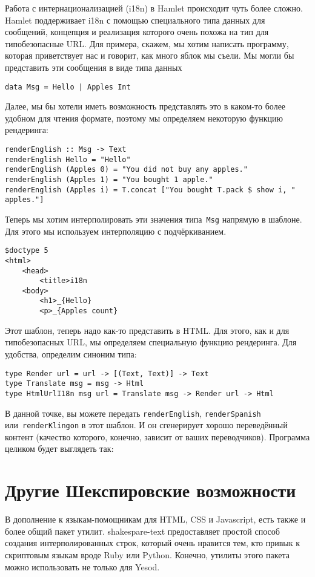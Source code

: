 Работа с интернационализацией (i18n) в Hamlet происходит чуть более
сложно.  Hamlet поддерживает i18n с помощью специального типа данных
для сообщений, концепция и реализация которого очень похожа на тип для типобезопасные
URL. Для примера, скажем, мы хотим написать программу, которая приветствует нас
и говорит, как много яблок мы съели. Мы могли бы представить эти сообщения в
виде типа данных

\begin{lstlisting}
data Msg = Hello | Apples Int
\end{lstlisting}

Далее, мы бы хотели иметь возможность представлять это в каком-то более удобном
для чтения формате, поэтому мы определяем некоторую функцию рендеринга:
\begin{lstlisting}
renderEnglish :: Msg -> Text
renderEnglish Hello = "Hello"
renderEnglish (Apples 0) = "You did not buy any apples."
renderEnglish (Apples 1) = "You bought 1 apple."
renderEnglish (Apples i) = T.concat ["You bought T.pack $ show i, " apples."]
\end{lstlisting}

Теперь мы хотим интерполировать эти значения типа~\lstinline'Msg' напрямую в
шаблоне.  Для этого мы используем интерполяцию с подчёркиванием.

\begin{lstlisting}
$doctype 5
<html>
    <head>
        <title>i18n
    <body>
        <h1>_{Hello}
        <p>_{Apples count}
\end{lstlisting}

Этот шаблон, теперь надо как-то представить в HTML.  Для этого, как и
для типобезопасных URL, мы определяем специальную функцию рендеринга.
Для удобства, определим синоним типа:

\begin{lstlisting}
type Render url = url -> [(Text, Text)] -> Text
type Translate msg = msg -> Html
type HtmlUrlI18n msg url = Translate msg -> Render url -> Html
\end{lstlisting}

В данной точке, вы можете передать \lstinline'renderEnglish',
\lstinline'renderSpanish' или~\lstinline'renderKlingon' в этот шаблон. И он
сгенерирует хорошо переведённый контент (качество которого, конечно, зависит от
ваших переводчиков). Программа целиком будет выглядеть так:

\section{Другие Шекспировские возможности}
В дополнение к языкам-помощникам для HTML, CSS и Javascript, есть также и более
общий пакет утилит. shakespare-text предоставляет простой способ
создания интерполированных строк, который очень нравится тем, кто привык к
скриптовым языкам вроде Ruby или Python. Конечно, утилиты этого пакета можно
использовать не только для Yesod.

